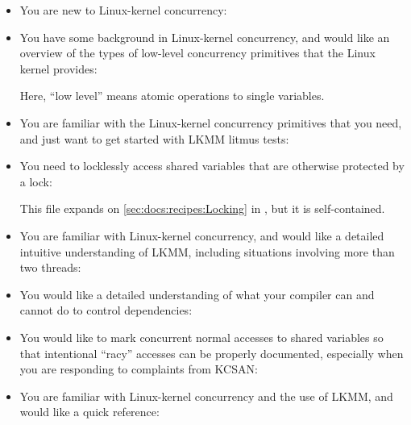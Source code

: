 \begin{itemize}
  \item You are new to Linux-kernel concurrency:
	\hyperref[sec:docs:Quick and simple guide to LKMM]{}

  \item You have some background in Linux-kernel concurrency, and would
	like an overview of the types of low-level concurrency primitives
	that the Linux kernel provides:
	\hyperref[sec:docs:Overview of memory-ordering operations]{
	  }

	Here, ``low level'' means atomic operations to single variables.

  \item You are familiar with the Linux-kernel concurrency primitives
	that you need, and just want to get started with LKMM litmus
	tests:
	\hyperref[sec:docs:Linux-kernel memory model litmus tests]{
	  }

  \item You need to locklessly access shared variables that are otherwise
	protected by a lock:
	\hyperref[sec:docs:Locking]{}

	This  file expands on
	\cref{sec:docs:recipes:Locking}
	in , but it is self-contained.

  \item You are familiar with Linux-kernel concurrency, and would
	like a detailed intuitive understanding of LKMM, including
	situations involving more than two threads:
	\hyperref[sec:docs:Recipes]{}

  \item You would like a detailed understanding of what your compiler can
	and cannot do to control dependencies:
	\hyperref[sec:docs:Control dependencies]{
	  }

  \item You would like to mark concurrent normal accesses to shared
	variables so that intentional ``racy'' accesses can be properly
	documented, especially when you are responding to complaints
	from KCSAN\@:
	\hyperref[sec:docs:Marking shared-memory accesses]{
	  }

  \item You are familiar with Linux-kernel concurrency and the use of
	LKMM, and would like a quick reference:
	\hyperref[sec:docs:Quick-reference guide to the Linux-kernel memory model]{
	  }


\end{itemize}
